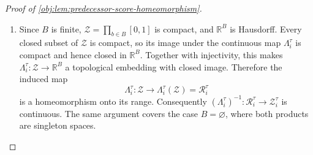 \begin{proof}[Proof of \cref{obj:lem:predecessor-score-homeomorphism}]
\begin{enumerate}
For \(\zeta\in[0,1]\), let \(v^{[b:\zeta]}\in[0,1]^n\) be the point obtained from \(v\) by replacing the coordinate \(\pi(b)\) by \(\zeta\):
\[
\bigl(v^{[b:\zeta]}\bigr)_a
=
\begin{cases}
\zeta, & a=\pi(b),\\
v_a, & a\ne \pi(b).
\end{cases}
\]
Define, on \([0,1]\), the one-coordinate score
\[
\psi_b(\zeta)
=
\log
\frac{q_{\pi(b)}(\zeta)}
{p_{\pi(b)}\!\left(\zeta\mid v_{\operatorname{pa}_G(\pi(b))}\right)}.
\]
Strict positivity and \(C^3\) regularity make \(\psi_b\) continuous on \([0,1]\) and differentiable on \((0,1)\). For \(0<\zeta<1\), the point \(v^{[b:\zeta]}\) lies in the latent cube, so the fixed own-derivative sign hypothesis gives
\[
0
<
s_{\pi(b)}\,
\frac{d}{d\zeta}
\log
\frac{q_{\pi(b)}(\zeta)}
{p_{\pi(b)}\!\left(\zeta\mid v_{\operatorname{pa}_G(\pi(b))}\right)}
=
s_{\pi(b)}\,\psi_b'(\zeta).
\]
Since \(s_{\pi(b)}\in\{-1,1\}\), the mean-value theorem yields, for any \(0\le \zeta_1<\zeta_2\le1\),
\[
\psi_b(\zeta_2)-\psi_b(\zeta_1)
=
\psi_b'(\zeta_\circ)(\zeta_2-\zeta_1)
\]
for some \(\zeta_\circ\in(\zeta_1,\zeta_2)\), with positive right-hand side when \(s_{\pi(b)}=1\) and negative right-hand side when \(s_{\pi(b)}=-1\). Thus \(\psi_b\) is strictly monotone on \([0,1]\).

Moreover,
\[
\psi_b(v_{\pi(b)})
=
\log
\frac{q_{\pi(b)}(v_{\pi(b)})}
{p_{\pi(b)}(v_{\pi(b)}\mid v_{\operatorname{pa}_G(\pi(b))})},
\]
and parent locality, together with \(v_a=w_a\) for all \(a\in\operatorname{pa}_G(\pi(b))\), gives
\[
p_{\pi(b)}(w_{\pi(b)}\mid v_{\operatorname{pa}_G(\pi(b))})
=
p_{\pi(b)}(w_{\pi(b)}\mid w_{\operatorname{pa}_G(\pi(b))}),
\]
so
\[
\psi_b(w_{\pi(b)})
=
\log
\frac{q_{\pi(b)}(w_{\pi(b)})}
{p_{\pi(b)}(w_{\pi(b)}\mid w_{\operatorname{pa}_G(\pi(b))})}.
\]
The equality \(L_b(f(v))=L_b(f(w))\) therefore gives
\[
\psi_b(v_{\pi(b)})=\psi_b(w_{\pi(b)}).
\]
By strict monotonicity of \(\psi_b\),
\[
v_{\pi(b)}=w_{\pi(b)}.
\]
The induction is complete. Finally, for each \(b\in B\),
\[
\chi_b=v_{\pi(b)}=w_{\pi(b)}=\chi'_b,
\]
so \(\chi=\chi'\) in the product cube. Thus \(\Lambda_i^\tau\) is injective. %

\item Since \(B\) is finite, \(\mathcal Z=\prod_{b\in B}[0,1]\) is compact, and \(\mathbb R^B\) is Hausdorff. Every closed subset of \(\mathcal Z\) is compact, so its image under the continuous map \(\Lambda_i^\tau\) is compact and hence closed in \(\mathbb R^B\). Together with injectivity, this makes \(\Lambda_i^\tau:\mathcal Z\to\mathbb R^B\) a topological embedding with closed image. Therefore the induced map
\[
\Lambda_i^\tau:\mathcal Z\longrightarrow \Lambda_i^\tau(\mathcal Z)=\mathcal R_i^\tau
\]
is a homeomorphism onto its range. Consequently \((\Lambda_i^\tau)^{-1}:\mathcal R_i^\tau\to\mathcal Z_i^\tau\) is continuous. The same argument covers the case \(B=\varnothing\), where both products are singleton spaces. %
\end{enumerate}
\end{proof}
